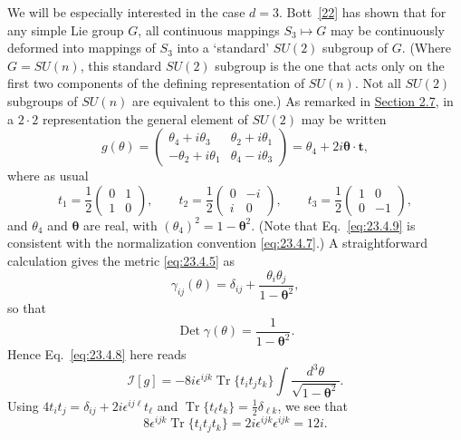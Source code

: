 We will be especially interested in the case $d=3$.
Bott~\hyperref[ch23-ref-22]{[22]} has shown that for any simple Lie group
$G$, all continuous mappings $S_3\mapsto G$ may be continuously deformed
into mappings of $S_3$ into a `standard' $SU(2)$ subgroup of $G$. (Where
$G=SU(n)$, this standard $SU(2)$ subgroup is the one that acts only on the
first two components of the defining representation of $SU(n)$. Not all
$SU(2)$ subgroups of $SU(n)$ are equivalent to this one.) As remarked in
\hyperref[sec:2.7]{Section 2.7}, in a $2\cdot2$ representation the general
element of $SU(2)$ may be written
\begin{equation}
g(\theta)=
\begin{pmatrix}
\theta_4+i\theta_3&\theta_2+i\theta_1\\
-\theta_2+i\theta_1&\theta_4-i\theta_3
\end{pmatrix}
=\theta_4+2i\boldsymbol{\theta}\cdot\mathbf t,
\tag{23.4.9}\label{eq:23.4.9}
\end{equation}
where as usual
\[
t_1=\frac12\begin{pmatrix}0&1\\1&0\end{pmatrix},
\qquad
t_2=\frac12\begin{pmatrix}0&-i\\i&0\end{pmatrix},
\qquad
t_3=\frac12\begin{pmatrix}1&0\\0&-1\end{pmatrix},
\]
and $\theta_4$ and $\boldsymbol{\theta}$ are real, with
$(\theta_4)^2=1-\boldsymbol{\theta}^2$. (Note that
Eq.~\eqref{eq:23.4.9} is consistent with the normalization convention
\eqref{eq:23.4.7}.) A straightforward calculation gives the metric
\eqref{eq:23.4.5} as
\begin{equation}
\gamma_{ij}(\theta)=\delta_{ij}
+\frac{\theta_i\theta_j}{1-\boldsymbol{\theta}^2},
\tag{23.4.10}\label{eq:23.4.10}
\end{equation}
so that
\begin{equation}
\operatorname{Det}\gamma(\theta)
=\frac{1}{1-\boldsymbol{\theta}^2}.
\tag{23.4.11}\label{eq:23.4.11}
\end{equation}
Hence Eq.~\eqref{eq:23.4.8} here reads
\[
\mathcal I[g]=-8i\epsilon^{ijk}\operatorname{Tr}\{t_it_jt_k\}
\int\frac{d^3\theta}{\sqrt{1-\boldsymbol{\theta}^2}}.
\]
Using $4t_it_j=\delta_{ij}+2i\epsilon^{ij\ell}t_\ell$ and
$\operatorname{Tr}\{t_\ell t_k\}=\frac12\delta_{\ell k}$, we see that
\[
8\epsilon^{ijk}\operatorname{Tr}\{t_it_jt_k\}
=2i\epsilon^{ijk}\epsilon^{ijk}=12i.
\]
